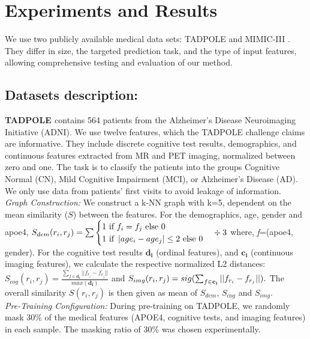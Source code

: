 \documentclass[runningheads]{llncs}
\begin{document}
 \section{Experiments and Results}
We use two publicly available medical data sets: TADPOLE \cite{tadpole} and MIMIC-III \cite{mimic}. They differ in size, the targeted prediction task, and the type of input features, allowing comprehensive testing and evaluation of our method.

\subsection{Datasets description:}
\textbf{TADPOLE \cite{tadpole}} contains 564 patients from the Alzheimer’s Disease Neuroimaging Initiative (ADNI). We use twelve features, which the TADPOLE challenge claims are informative. They include discrete cognitive test results, demographics, and continuous features extracted from MR and PET imaging, normalized between zero and one. The task is to classify the patients into the groups Cognitive Normal (CN), Mild Cognitive Impairment (MCI), or Alzheimer’s Disease (AD). We only use data from patients' first visits to avoid leakage of information.\\
\textit{Graph Construction:}
We construct a k-NN graph with k=5, dependent on the mean similarity ($S$) between the features. For the demographics, age, gender and apoe4,
$S_{dem}(r_i, r_j) = \sum \begin{cases}   
1 \textnormal{ if } f_i = f_j  \textnormal{ else } 0 \\  
1 \textnormal{ if } \left|age_{i} - age_{j} \right| \le 2 \textnormal{ else } 0
\end{cases}\div 3
$
where, \textit{f}=(apoe4, gender).
For the cognitive test results $\mathbf{d_i}$ (ordinal features), and $\mathbf{c_i}$ (continuous imaging features), we calculate the respective normalized L2 distances:
$S_{cog}(r_i, r_j) = \frac{\sum_{f \in \mathbf{d_i}}||f_{r_i} - f_{r_j}||}{max(\mathbf{d_i})}
$ and
$S_{img}(r_i, r_j) = sig({\sum_{f \in \mathbf{c_{i}}}||f_{r_i} - \\f_{r_j}||}).
$
The overall similarity $S(r_i, r_j)$ is then given as mean of $S_{dem}$, $S_{cog}$ and $S_{img}$.\\
\textit{Pre-Training Configuration:} During pre-training on TADPOLE, we randomly mask 30\% of the medical features (APOE4, cognitive tests, and imaging features) in each sample. The masking ratio of  30\% was chosen experimentally. \\
\end{document}
